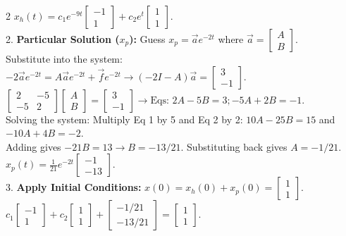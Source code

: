 \documentclass[4pt]{extarticle}
\begin{document}
\begin{multicols}{2}
$x_h(t) = c_1e^{-9t}\begin{bmatrix} -1 \\ 1 \end{bmatrix} + c_2e^t\begin{bmatrix} 1 \\ 1 \end{bmatrix}$. \\
2. \textbf{Particular Solution ($x_p$):} Guess $x_p = \vec{a}e^{-2t}$ where $\vec{a} = \begin{bmatrix} A \\ B \end{bmatrix}$. \\
Substitute into the system: $-2\vec{a}e^{-2t} = A\vec{a}e^{-2t} + \vec{f}e^{-2t} \rightarrow (-2I - A)\vec{a} = \begin{bmatrix} 3 \\ -1 \end{bmatrix}$. \\
$\begin{bmatrix} 2 & -5 \\ -5 & 2 \end{bmatrix} \begin{bmatrix} A \\ B \end{bmatrix} = \begin{bmatrix} 3 \\ -1 \end{bmatrix} \rightarrow \text{Eqs: } 2A-5B=3; -5A+2B=-1$. \\
Solving the system: Multiply Eq 1 by 5 and Eq 2 by 2: $10A-25B=15$ and $-10A+4B=-2$. \\
Adding gives $-21B = 13 \rightarrow B = -13/21$. Substituting back gives $A = -1/21$. \\
$x_p(t) = \frac{1}{21}e^{-2t}\begin{bmatrix} -1 \\ -13 \end{bmatrix}$. \\
3. \textbf{Apply Initial Conditions:} $x(0) = x_h(0) + x_p(0) = \begin{bmatrix} 1 \\ 1 \end{bmatrix}$. \\
$c_1\begin{bmatrix} -1 \\ 1 \end{bmatrix} + c_2\begin{bmatrix} 1 \\ 1 \end{bmatrix} + \begin{bmatrix} -1/21 \\ -13/21 \end{bmatrix} = \begin{bmatrix} 1 \\ 1 \end{bmatrix}$. \\

\end{multicols}
\end{document}
